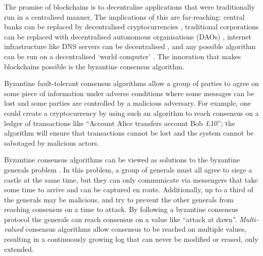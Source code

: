 
The promise of blockchains is to decentralise applications that were traditionally run in a centralised manner. The implications of this are far-reaching: central banks can be replaced by decentralised cryptocurrencies \cite{nakamotoBitcoinPeertoPeerElectronic2008,perniceCryptocurrency2021}, traditional corporations can be replaced with decentralised autonomous organisations (DAOs) \cite{hassanDecentralizedAutonomousOrganization2021,ethereumWhite}, internet infrastructure like DNS servers can be decentralised \cite{EthereumNameService}, and any possible algorithm can be run on a decentralised `world computer' \cite{ethereumWhite,ethereumYellow}. The innovation that makes blockchains possible is the byzantine consensus algorithm.

Byzantine fault-tolerant consensus algorithms allow a group of parties to agree on some piece of information under adverse conditions where some messages can be lost and some parties are controlled by a malicious adversary. For example, one could create a cryptocurrency by using such an algorithm to reach consensus on a ledger of transactions like ``Account Alice transfers account Bob £10''; the algorithm will ensure that transactions cannot be lost and the system cannot be sabotaged by malicious actors.

Byzantine consensus algorithms can be viewed as solutions to the byzantine generals problem \cite{lamportByzantineGeneralsProblem1982}. In this problem, a group of generals must all agree to siege a castle at the same time, but they can only communicate via messengers that take some time to arrive and can be captured en route. Additionally, up to a third of the generals may be malicious, and try to prevent the other generals from reaching consensus on a time to attack. By following a byzantine consensus protocol the generals can reach consensus on a value like ``attack at dawn''. \textit{Multi-valued} consensus algorithms allow consensus to be reached on multiple values, resulting in a continuously growing log that can never be modified or erased, only extended.

